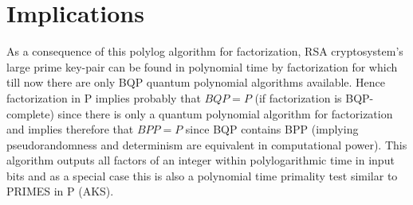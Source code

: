 \documentclass[11pt,onecolumn]{article}
\begin{document}
\section{Implications}
As a consequence of this polylog algorithm for factorization, RSA cryptosystem's large prime key-pair can be found in polynomial time by factorization for which till now there are only BQP quantum polynomial algorithms available. Hence factorization in P implies probably that $BQP=P$ (if factorization is BQP-complete) since there is only a quantum polynomial algorithm for factorization and implies therefore that $BPP=P$ since BQP contains BPP (implying pseudorandomness and determinism are equivalent in computational power). This algorithm outputs all factors of an integer within polylogarithmic time in input bits and as a special case this is also a polynomial time primality test similar to PRIMES in P (AKS).
\end{document}
